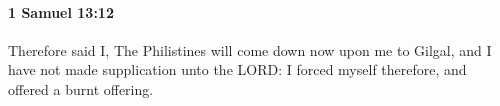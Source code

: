 
		\paragraph{1 Samuel 13:12} %
			\label{1SAMUEL-13-12}

			Therefore said I, The Philistines will come down now upon me to Gilgal, and I have not made supplication unto the LORD: I forced myself therefore, and offered a burnt offering.


